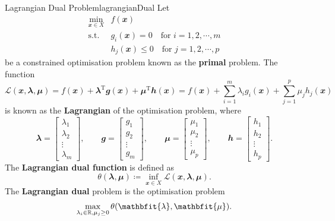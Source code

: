 \documentclass[math, code]{amznotes}
\theoremstyle{remark}
\begin{document}
\begin{dfnbox}{Lagrangian Dual Problem}{lagrangianDual}
    Let
    \begin{align*}
        \min_{\mathbfit{x} \in X} & f(\mathbfit{x}) \\
        \textrm{s.t. } & g_i(\mathbfit{x}) = 0 \quad\textrm{for } i = 1, 2, \cdots, m \\
        & h_j(\mathbfit{x}) \leq 0 \quad\textrm{for } j = 1, 2, \cdots, p
    \end{align*}
    be a constrained optimisation problem known as the {\color{red} \textbf{primal}} problem. The function
    \begin{equation*}
        \mathcal{L}(\mathbfit{x}, \mathbfit{\lambda}, \mathbfit{\mu}) = f(\mathbfit{x}) + \mathbfit{\lambda}^{\mathrm{T}}\mathbfit{g}(\mathbfit{x}) + \mathbfit{\mu}^{\mathrm{T}}\mathbfit{h}(\mathbfit{x}) = f(\mathbfit{x}) + \sum_{i = 1}^{m}\lambda_i g_i(\mathbfit{x}) + \sum_{j = 1}^{p}\mu_j h_j(\mathbfit{x})
    \end{equation*}
    is known as the {\color{red} \textbf{Lagrangian}} of the optimisation problem, where
    \begin{equation*}
        \mathbfit{\lambda} = \begin{bmatrix}
            \lambda_1 \\
            \lambda_2 \\
            \vdots \\
            \lambda_m
        \end{bmatrix}, \qquad \mathbfit{g} = \begin{bmatrix}
            g_1 \\
            g_2 \\
            \vdots \\
            g_m
        \end{bmatrix}, \qquad \mathbfit{\mu} = \begin{bmatrix}
            \mu_1 \\
            \mu_2 \\
            \vdots \\
            \mu_p
        \end{bmatrix}, \qquad \mathbfit{h} = \begin{bmatrix}
            h_1 \\
            h_2 \\
            \vdots \\
            h_p
        \end{bmatrix}.
    \end{equation*}
    The {\color{red} \textbf{Lagrangian dual function}} is defined as
    \begin{equation*}
        \theta(\mathbfit{\lambda}, \mathbfit{\mu}) \coloneqq \inf_{\mathbfit{x} \in X}\mathcal{L}(\mathbfit{x}, \mathbfit{\lambda}, \mathbfit{\mu}).
    \end{equation*}
    The {\color{red} \textbf{Lagrangian dual}} problem is the optimisation problem
    \begin{align*}
        \max_{\lambda_i \in \R, \mu_j \geq 0}\theta(\mathbfit{\lambda}, \mathbfit{\mu}).
    \end{align*}
\end{dfnbox}
\end{document}
